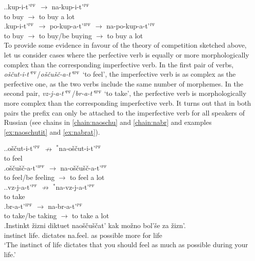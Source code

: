 \ex.\ag.\label{chain:nakupit}kup-i-t'$^{\textsc{pf}}$ $\rightarrow$ na-kup-i-t'$^{\textsc{pf}}$\\
{to buy} $\rightarrow$ {to buy a lot}\\
\bg.\label{chain:napokupat}kup-i-t'$^{\textsc{pf}}$ $\rightarrow$ po-kup-a-t'$^{\textsc{ipf}}$ $\rightarrow$ na-po-kup-a-t'$^{\textsc{pf}}$\\
{to buy} $\rightarrow$ {to buy/be buying} $\rightarrow$ {to buy a lot}\\

To provide some evidence in favour of the theory of competition sketched above, let us consider cases where the perfective verb is equally or more morphologically complex than the corresponding imperfective verb. In the first pair of verbs, \textit{o\v{s}\v{c}ut-i-t'}$^{\textsc{pf}}$\slash\textit{o\v{s}\v{c}u\v{s}\v{c}-a-t'}$^{\textsc{ipf}}$ `to feel', the imperfective verb is as complex as the perfective one, as the two verbs include the same number of morphemes. In the second pair, \textit{vz-j-a-t'}$^{\textsc{pf}}$\slash\textit{br-a-t'}$^{\textsc{ipf}}$ `to take', the perfective verb is morphologically more complex than the corresponding imperfective verb. It turns out that in both pairs the  prefix  can only be attached to the imperfective verb for all speakers of Russian (see chains in \ref{chain:naoschu} and \ref{chain:nabr} and examples \ref{ex:naoschutit} and \ref{ex:nabrat}). 

\ex.\label{chain:naoschu}\ag.o\v{s}\v{c}ut-i-t'$^{\textsc{pf}}$ $\nrightarrow$ $^*$na-o\v{s}\v{c}ut-i-t'$^{\textsc{pf}}$\label{chain:oschutit}\\
{to feel} {} {}\\
\bg.\label{chain:oschuschat}o\v{s}\v{c}u\v{s}\v{c}-a-t'$^{\textsc{ipf}}$ $\rightarrow$ na-o\v{s}\v{c}u\v{s}\v{c}-a-t'$^{\textsc{pf}}$\\
{to feel/be feeling} $\rightarrow$ {to feel a lot}\\

\ex.\label{chain:nabr}\ag.vz-j-a-t'$^{\textsc{pf}}$ $\nrightarrow$ $^*$na-vz-j-a-t'$^{\textsc{pf}}$\label{chain:navzjat}\\
{to take} {} {}\\
\bg.\label{chain:nabrat}br-a-t'$^{\textsc{ipf}}$ $\rightarrow$ na-br-a-t'$^{\textsc{pf}}$\\
{to take/be taking} $\rightarrow$ {to take a lot}\\

\exg.\label{ex:naoschutit}Instinkt \v{z}izni diktuet nao\v{s}\v{c}u\v{s}\v{c}at' kak mo\v{z}no bol'\v{s}e za \v{z}izn'.\\
instinct life. dictates na.feel. as possible more for life\\
\trans `The instinct of life dictates that you should feel as much as possible during your life.'\\

